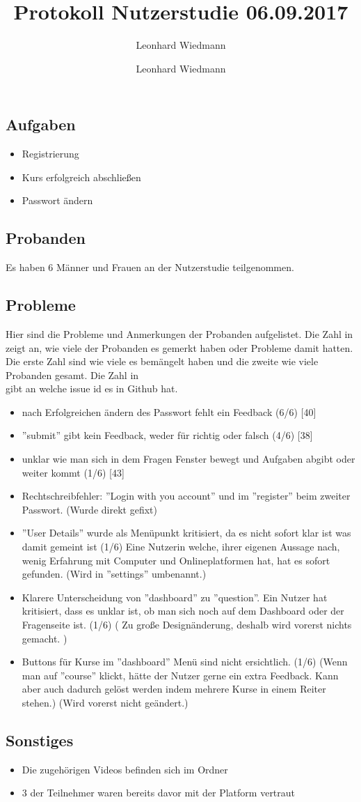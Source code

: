 \documentclass[colorback, accentcolor=tud1c, paper=a4]{tudexercise}
\title{Protokoll Nutzerstudie 06.09.2017}
\subtitle{Leonhard Wiedmann}
\author{Leonhard Wiedmann}
\begin{document}
\maketitle
\subsection*{Aufgaben}
\begin{itemize}
	\item Registrierung
	\item Kurs erfolgreich abschließen
	\item Passwort ändern
\end{itemize}

\subsection*{Probanden}
Es haben 6 Männer und Frauen an der Nutzerstudie teilgenommen.

\subsection*{Probleme}
  Hier sind die Probleme und Anmerkungen der Probanden aufgelistet. Die Zahl in \( \) zeigt an, wie viele der Probanden es gemerkt haben oder Probleme damit hatten. Die erste Zahl sind wie viele es bemängelt haben und die zweite wie viele Probanden gesamt. Die Zahl in \[ \] gibt an welche issue id es in Github hat.
  \begin{itemize}
    \item nach Erfolgreichen ändern des Passwort fehlt ein Feedback (6/6) [40]
		\item ''submit'' gibt kein Feedback, weder für richtig oder falsch (4/6) [38]
		\item unklar wie man sich in dem Fragen Fenster bewegt und Aufgaben abgibt oder weiter kommt (1/6) [43]
		\item Rechtschreibfehler: ''Login with you account'' und im ''register'' beim zweiter Passwort. (Wurde direkt gefixt)
		\item ''User Details'' wurde als Menüpunkt kritisiert, da es nicht sofort klar ist was damit gemeint ist (1/6) { Eine Nutzerin welche, ihrer eigenen Aussage nach, wenig Erfahrung mit Computer und Onlineplatformen hat, hat es sofort gefunden. } (Wird in ''settings'' umbenannt.)
		\item Klarere Unterscheidung von ''dashboard'' zu ''question''. Ein Nutzer hat kritisiert, dass es unklar ist, ob man sich noch auf dem Dashboard oder der Fragenseite ist. (1/6) ( Zu große Designänderung, deshalb wird vorerst nichts gemacht. )
    \item Buttons für Kurse im ''dashboard'' Menü sind nicht ersichtlich. (1/6) (Wenn man auf ''course'' klickt, hätte der Nutzer gerne ein extra Feedback. Kann aber auch dadurch gelöst werden indem mehrere Kurse in einem Reiter stehen.) (Wird vorerst nicht geändert.)
   \end{itemize}

 \subsection*{Sonstiges}
 	\begin{itemize}
		\item Die zugehörigen Videos befinden sich im Ordner
		\item 3 der Teilnehmer waren bereits davor mit der Platform vertraut
	\end{itemize}
\end{document}
